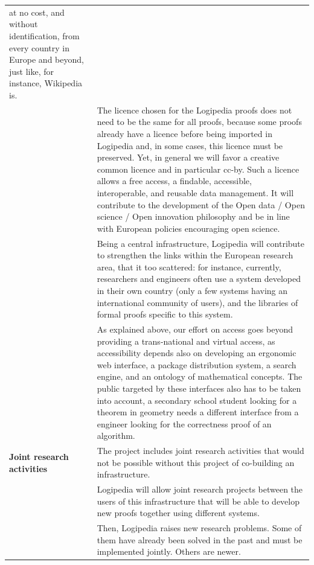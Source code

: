 \begin{longtable}{|p{}|p{}|}
at no cost, and without identification, from every country in Europe
and beyond, just like, for instance, Wikipedia is.\\
&
\hspace{0.4cm} The licence chosen for the Logipedia proofs does not
need to be the same for all proofs, because some proofs already have a
licence before being imported in Logipedia and, in some cases, this
licence must be preserved.  Yet, in general we will favor a creative
common licence and in particular cc-by.  Such a licence allows a free
access, a findable, accessible, interoperable, and reusable data
management. It will contribute to the development of the Open data /
Open science / Open innovation philosophy and be in line with European
policies encouraging open science.
\\
&
\hspace{0.4cm} Being a central infrastructure, Logipedia will
contribute to strengthen the links within the European research area,
that it too scattered: for instance, currently, researchers and
engineers often use a system developed in their own country (only a
few systems having an international community of users), and the
libraries of formal proofs specific to this system.
\\
&
\hspace{0.4cm}
As explained above, our effort on access goes beyond providing a
trans-national and virtual access, as accessibility depends also on
developing an ergonomic web interface, a package distribution system,
a search engine, and an ontology of mathematical concepts. The public
targeted by these interfaces also has to be taken into account, a
secondary school student looking for a theorem in geometry needs a
different interface from a engineer looking for the correctness proof
of an algorithm.\\
\hline
{\bf Joint research activities}
&
The project includes joint research activities that would not be possible 
without this project of co-building an infrastructure.
\\
&
\hspace{0.4cm} Logipedia will allow joint research projects between
the users of this infrastructure that will be able to develop new
proofs together using different systems.\\
&
\hspace{0.4cm}
Then, Logipedia raises new research
problems. Some of them have already been solved in the past and
must be implemented jointly. Others are newer.\\

\end{longtable}
